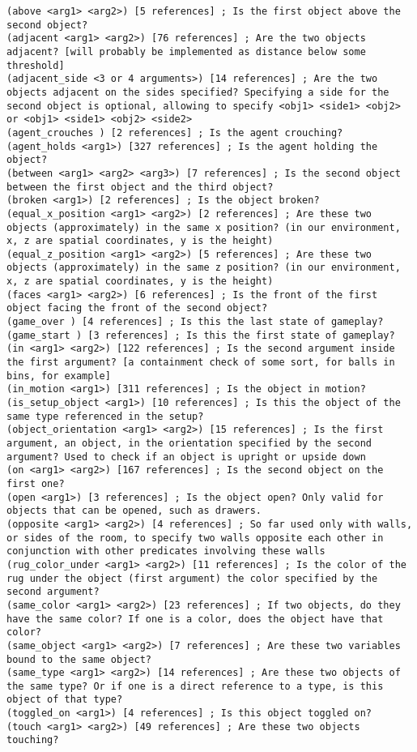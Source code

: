 \documentclass{article}
\begin{document}
\begin{lstlisting}
(above <arg1> <arg2>) [5 references] ; Is the first object above the second object?
(adjacent <arg1> <arg2>) [76 references] ; Are the two objects adjacent? [will probably be implemented as distance below some threshold]
(adjacent_side <3 or 4 arguments>) [14 references] ; Are the two objects adjacent on the sides specified? Specifying a side for the second object is optional, allowing to specify <obj1> <side1> <obj2> or <obj1> <side1> <obj2> <side2>
(agent_crouches ) [2 references] ; Is the agent crouching?
(agent_holds <arg1>) [327 references] ; Is the agent holding the object?
(between <arg1> <arg2> <arg3>) [7 references] ; Is the second object between the first object and the third object?
(broken <arg1>) [2 references] ; Is the object broken?
(equal_x_position <arg1> <arg2>) [2 references] ; Are these two objects (approximately) in the same x position? (in our environment, x, z are spatial coordinates, y is the height)
(equal_z_position <arg1> <arg2>) [5 references] ; Are these two objects (approximately) in the same z position? (in our environment, x, z are spatial coordinates, y is the height)
(faces <arg1> <arg2>) [6 references] ; Is the front of the first object facing the front of the second object?
(game_over ) [4 references] ; Is this the last state of gameplay?
(game_start ) [3 references] ; Is this the first state of gameplay?
(in <arg1> <arg2>) [122 references] ; Is the second argument inside the first argument? [a containment check of some sort, for balls in bins, for example]
(in_motion <arg1>) [311 references] ; Is the object in motion?
(is_setup_object <arg1>) [10 references] ; Is this the object of the same type referenced in the setup?
(object_orientation <arg1> <arg2>) [15 references] ; Is the first argument, an object, in the orientation specified by the second argument? Used to check if an object is upright or upside down
(on <arg1> <arg2>) [167 references] ; Is the second object on the first one?
(open <arg1>) [3 references] ; Is the object open? Only valid for objects that can be opened, such as drawers.
(opposite <arg1> <arg2>) [4 references] ; So far used only with walls, or sides of the room, to specify two walls opposite each other in conjunction with other predicates involving these walls
(rug_color_under <arg1> <arg2>) [11 references] ; Is the color of the rug under the object (first argument) the color specified by the second argument?
(same_color <arg1> <arg2>) [23 references] ; If two objects, do they have the same color? If one is a color, does the object have that color?
(same_object <arg1> <arg2>) [7 references] ; Are these two variables bound to the same object?
(same_type <arg1> <arg2>) [14 references] ; Are these two objects of the same type? Or if one is a direct reference to a type, is this object of that type?
(toggled_on <arg1>) [4 references] ; Is this object toggled on?
(touch <arg1> <arg2>) [49 references] ; Are these two objects touching?
\end{lstlisting}
\end{document}
